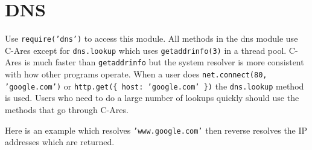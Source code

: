 \section{DNS}\label{dns}

\begin{Shaded}
\begin{Highlighting}[]
 
\end{Highlighting}
\end{Shaded}

Use \texttt{require('dns')} to access this module. All methods in the
dns module use C-Ares except for \texttt{dns.lookup} which uses
\texttt{getaddrinfo(3)} in a thread pool. C-Ares is much faster than
\texttt{getaddrinfo} but the system resolver is more consistent with how
other programs operate. When a user does
\texttt{net.connect(80, 'google.com')} or
\texttt{http.get(\{ host: 'google.com' \})} the \texttt{dns.lookup}
method is used. Users who need to do a large number of lookups quickly
should use the methods that go through C-Ares.

Here is an example which resolves \texttt{'www.google.com'} then reverse
resolves the IP addresses which are returned.

\begin{Shaded}
\begin{Highlighting}[]
 \NormalTok{(}\NormalTok{);}

\NormalTok{(}\NormalTok{, } 
    

  \NormalTok{(} \NormalTok{+ }

  \NormalTok{(} 
     
       
         
      \NormalTok{\}}

      \NormalTok{(}  \NormalTok{+ }
    \NormalTok{\});}
  \NormalTok{\});}
\NormalTok{\});}
\end{Highlighting}
\end{Shaded}

